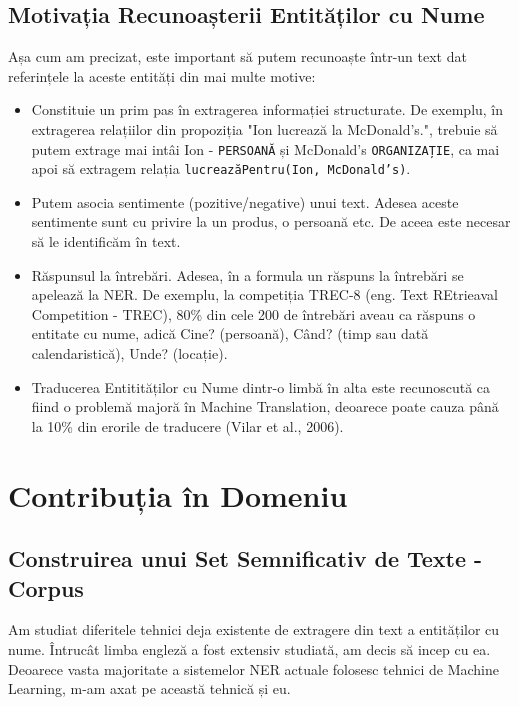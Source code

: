 \subsection{Motivația Recunoașterii Entităților cu Nume}

Așa cum am precizat, este important să putem recunoaște într-un text dat referințele la aceste entități din mai multe motive:

\begin{itemize}
\item Constituie un prim pas în extragerea informației structurate. De exemplu, în extragerea relațiilor din propoziția "Ion lucrează la McDonald's.", trebuie să putem extrage mai intâi Ion - \texttt{PERSOANĂ} și McDonald's \texttt{ORGANIZAȚIE}, ca mai apoi să extragem relația \texttt{lucreazăPentru(Ion, McDonald's)}.
\item Putem asocia sentimente (pozitive/negative) unui text. Adesea aceste sentimente sunt cu privire la un produs, o persoană etc. De aceea este necesar să le identificăm în text.
\item Răspunsul la întrebări. Adesea, în a formula un răspuns la întrebări se apelează la NER. De exemplu, la competiția TREC-8 (eng. Text REtrieaval Competition - TREC), 80\% din cele 200 de întrebări aveau ca răspuns o entitate cu nume, adică Cine? (persoană), Când? (timp sau dată calendaristică), Unde? (locație).\cite{trec8}
\item Traducerea Entitităților cu Nume dintr-o limbă în alta este recunoscută ca fiind o problemă majoră în Machine Translation, deoarece poate cauza până la 10\% din erorile de traducere (Vilar et al., 2006).\cite{vilar2006}
\end{itemize}

\section{Contribuția în Domeniu}
\label{sec:contribution}

\subsection{Construirea unui Set Semnificativ de Texte - Corpus}
\label{sub-sec:corpus-building}

Am studiat diferitele tehnici deja existente de extragere din text a entităților cu nume. Întrucât limba engleză a fost extensiv studiată, am decis să incep cu ea. Deoarece vasta majoritate a sistemelor NER actuale folosesc tehnici de Machine Learning, m-am axat pe această tehnică și eu.

